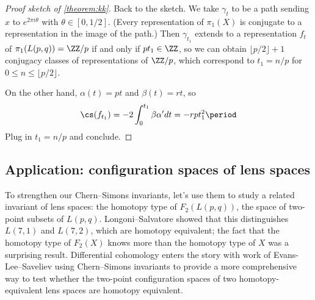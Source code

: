 \begin{proof}[Proof sketch of \cref{theorem:kk}]
  Back to the sketch. We take $\gamma_t$ to be a path sending $x$ to $e^{2\pi i\theta}$ with $\theta\in[0, 1/2]$.
  (Every representation of $\pi_1(X)$ is conjugate to a representation in the image of the path.)
  Then $\gamma_{t_1}$ extends to a representation $f _t$ of $\pi_1(L(p,q))=\ZZ/p$ if and only if $pt_1\in\ZZ$, so
  we can obtain $\lfloor p/2 \rfloor+1$ conjugacy classes of representations of $\ZZ/p$, which correspond to $t_1 =
  n/p$ for $0\le n\le \lfloor p/2\rfloor$.

  On the other hand, $\alpha(t)=pt$ and $\beta(t)=rt$, so
  \begin{equation*}
    \cs(f _{t_1})=-2\int_0^{t_1}\beta\alpha'dt=-rpt_1^2\period
  \end{equation*}
  Plug in $t_1 = n/p$ and conclude.
\end{proof}


\subsection{Application: configuration spaces of lens spaces}
\label{config_ssec}
To strengthen our Chern--Simons invariants, let's use them to study a related invariant of lens spaces:
the homotopy type of $F_2(L(p, q))$, the space of two-point subsets of
$L(p, q)$. Longoni--Salvatore \cite{LS05} showed that this distinguishes $L(7, 1)$ and $L(7, 2)$, which are
homotopy equivalent; the fact that the homotopy type of $F_2(X)$ knows more than the homotopy type of $X$ was a
surprising result. Differential cohomology enters the story with work of Evans-Lee--Saveliev \cite{deletedsquare}
using Chern--Simons invariants to provide a more comprehensive way to test whether the two-point configuration
spaces of two homotopy-equivalent lens spaces are homotopy equivalent.

